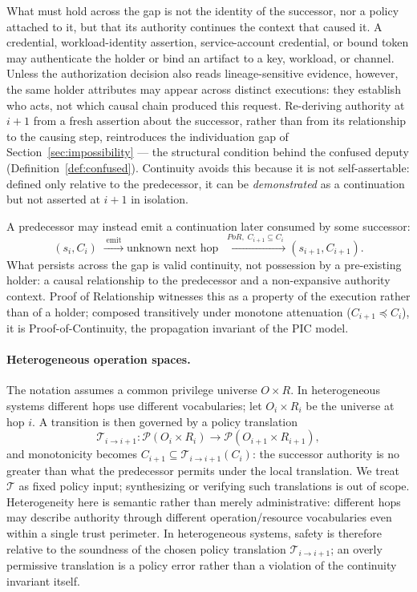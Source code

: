 \documentclass[11pt]{article}
\begin{document}
What must hold across the gap is not the identity of the successor, nor a policy
attached to it, but that its authority continues the context that caused it. A
credential, workload-identity assertion, service-account credential, or bound
token may authenticate the holder or bind an artifact to a key, workload, or
channel. Unless the authorization decision also reads lineage-sensitive evidence,
however, the same holder attributes may appear across distinct executions: they
establish who acts, not which causal chain produced this request. Re-deriving authority at $i+1$
from a fresh assertion about the successor, rather than from its relationship to
the causing step, reintroduces the individuation gap of
Section~\ref{sec:impossibility} --- the structural condition behind the confused
deputy (Definition~\ref{def:confused}). Continuity avoids this because it is not
self-assertable: defined only relative to the predecessor, it can be
\emph{demonstrated} as a continuation but not asserted at $i+1$ in isolation.

A predecessor may instead emit a continuation later consumed by some successor:
\[
(s_i,C_i)
\;\xrightarrow{\;\mathrm{emit}\;}
\text{unknown next hop}
\;\xrightarrow{\;PoR,\; C_{i+1}\subseteq C_i\;}
(s_{i+1},C_{i+1}).
\]
What persists across the gap is valid continuity, not possession by a pre-existing
holder: a causal relationship to the predecessor and a non-expansive authority
context. Proof of Relationship witnesses this as a property of the execution
rather than of a holder; composed transitively under monotone attenuation
($C_{i+1} \preceq C_i$), it is Proof-of-Continuity, the propagation invariant of
the PIC model.

\paragraph{Heterogeneous operation spaces.}
The notation assumes a common privilege universe $O \times R$. In heterogeneous
systems different hops use different vocabularies; let $O_i \times R_i$ be the
universe at hop $i$. A transition is then governed by a policy translation
\[
\mathcal{T}_{i \to i+1} : \mathcal{P}(O_i \times R_i) \to
\mathcal{P}(O_{i+1} \times R_{i+1}),
\]
and monotonicity becomes $C_{i+1} \subseteq \mathcal{T}_{i \to i+1}(C_i)$: the
successor authority is no greater than what the predecessor permits under the
local translation. We treat $\mathcal{T}$ as fixed policy input; synthesizing or
verifying such translations is out of scope. Heterogeneity here is semantic
rather than merely administrative: different hops may describe authority through
different operation/resource vocabularies even within a single trust perimeter.
In heterogeneous systems, safety is therefore relative to the soundness of the
chosen policy translation $\mathcal{T}_{i \to i+1}$; an overly permissive
translation is a policy error rather than a violation of the continuity invariant
itself.
\end{document}
